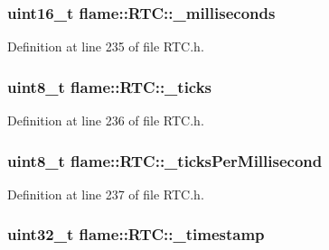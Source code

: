 \hypertarget{classflame_1_1_r_t_c_a0152322ecff4547471a1f8d84b99cb8e}{
\subsubsection[{\-\_\-milliseconds}]{\setlength{\rightskip}{0pt plus 5cm}uint16\-\_\-t flame\-::\-R\-T\-C\-::\-\_\-milliseconds\hspace{0.3cm}{\ttfamily [protected]}}}\label{classflame_1_1_r_t_c_a0152322ecff4547471a1f8d84b99cb8e}


Definition at line 235 of file R\-T\-C.\-h.

\hypertarget{classflame_1_1_r_t_c_a9dc99aa09ba42642a43f230f5c2df5eb}{
\subsubsection[{\-\_\-ticks}]{\setlength{\rightskip}{0pt plus 5cm}uint8\-\_\-t flame\-::\-R\-T\-C\-::\-\_\-ticks\hspace{0.3cm}{\ttfamily [protected]}}}\label{classflame_1_1_r_t_c_a9dc99aa09ba42642a43f230f5c2df5eb}


Definition at line 236 of file R\-T\-C.\-h.

\hypertarget{classflame_1_1_r_t_c_afcfc861a7923a01a54e8b03eb46d48c3}{
\subsubsection[{\-\_\-ticks\-Per\-Millisecond}]{\setlength{\rightskip}{0pt plus 5cm}uint8\-\_\-t flame\-::\-R\-T\-C\-::\-\_\-ticks\-Per\-Millisecond\hspace{0.3cm}{\ttfamily [protected]}}}\label{classflame_1_1_r_t_c_afcfc861a7923a01a54e8b03eb46d48c3}


Definition at line 237 of file R\-T\-C.\-h.

\hypertarget{classflame_1_1_r_t_c_a31320e54b29c8a1608782dccaea5bf32}{
\subsubsection[{\-\_\-timestamp}]{\setlength{\rightskip}{0pt plus 5cm}uint32\-\_\-t flame\-::\-R\-T\-C\-::\-\_\-timestamp\hspace{0.3cm}{\ttfamily [protected]}}}\label{classflame_1_1_r_t_c_a31320e54b29c8a1608782dccaea5bf32}


